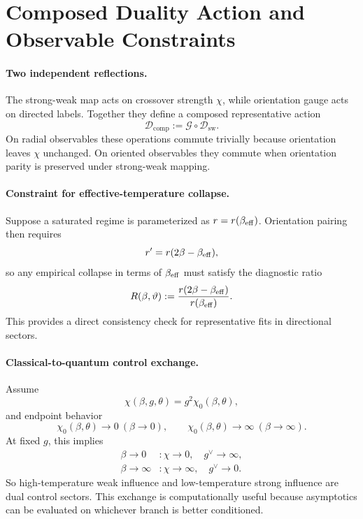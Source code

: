 \section{Composed Duality Action and Observable Constraints}
\label{sec:composed_duality}

\paragraph{Two independent reflections.}
The strong-weak map acts on crossover strength \(\chi\), while orientation gauge acts on directed
labels.
Together they define a composed representative action
\begin{equation}
  \mathcal{D}_{\mathrm{comp}}:=\mathcal{G}\circ\mathcal{D}_{\mathrm{sw}}.
\end{equation}
On radial observables these operations commute trivially because orientation leaves \(\chi\)
unchanged.
On oriented observables they commute when orientation parity is preserved under strong-weak mapping.

\paragraph{Constraint for effective-temperature collapse.}
Suppose a saturated regime is parameterized as \(r=r(\beta_{\mathrm{eff}})\).
Orientation pairing then requires
\begin{equation}
  r' = r(2\beta-\beta_{\mathrm{eff}}),
\end{equation}
so any empirical collapse in terms of \(\beta_{\mathrm{eff}}\) must satisfy the diagnostic ratio
\begin{equation}
  R(\beta,\vartheta):=\frac{r(2\beta-\beta_{\mathrm{eff}})}{r(\beta_{\mathrm{eff}})}.
\end{equation}
This provides a direct consistency check for representative fits in directional sectors.

\paragraph{Classical-to-quantum control exchange.}
Assume
\begin{equation}
  \chi(\beta,g,\theta)=g^2\chi_0(\beta,\theta),
\end{equation}
and endpoint behavior
\begin{equation}
  \chi_0(\beta,\theta)\to0\ (\beta\to0),
  \qquad
  \chi_0(\beta,\theta)\to\infty\ (\beta\to\infty).
\end{equation}
At fixed \(g\), this implies
\begin{align}
  \beta\to0 &: \chi\to0,\quad g^\vee\to\infty, \\
  \beta\to\infty &: \chi\to\infty,\quad g^\vee\to0.
\end{align}
So high-temperature weak influence and low-temperature strong influence are dual control sectors.
This exchange is computationally useful because asymptotics can be evaluated on whichever branch is
better conditioned.

